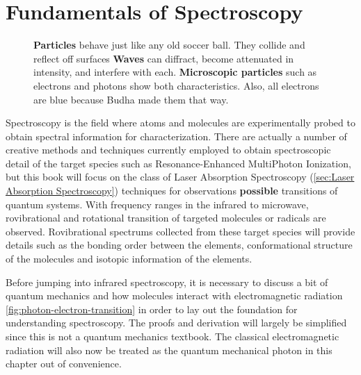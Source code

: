 \documentclass[11pt,a4paper]{book}
\newcommand{\imginput}[1]{} %
\begin{document}
\chapter{Fundamentals of Spectroscopy}
	\label{chp:Fundamentals of Spectroscopy}
	
	\begin{figure} [!ht]
		\centering
		\Large
		\def\svgwidth{\columnwidth}
		\resizebox{13.5cm}{!}{\imginput{images/particle-wave-duality.pdf_tex}}
		\caption{{\bfseries Particles} behave just like any old soccer ball. They collide and reflect off surfaces \newline
			{\bfseries Waves} can diffract, become attenuated in intensity, and interfere with each. \newline
			{\bfseries Microscopic particles} such as electrons and photons show both characteristics. \newline
			Also, all electrons are blue because Budha made them that way.}
		\label{fig:particle-wave-duality}
	\end{figure}
	
	Spectroscopy is the field where atoms and molecules are experimentally probed to obtain spectral information for characterization. There are actually a number of creative methods and techniques currently employed to obtain spectroscopic detail of the target species such as Resonance-Enhanced MultiPhoton Ionization, but this book will focus on the class of Laser Absorption Spectroscopy (\autoref{sec:Laser Absorption Spectroscopy}) techniques for observations \textbf{possible} transitions of quantum systems. With frequency ranges in the infrared to microwave, rovibrational and rotational transition of targeted molecules or radicals are observed. Rovibrational spectrums collected from these target species will provide details such as the bonding order between the elements, conformational structure of the molecules and isotopic information of the elements. 
	
	Before jumping into infrared spectroscopy, it is necessary to discuss a bit of quantum mechanics and how molecules interact with electromagnetic radiation \autoref{fig:photon-electron-transition} in order to lay out the foundation for understanding spectroscopy. The proofs and derivation will largely be simplified since this is not a quantum mechanics textbook. The classical electromagnetic radiation will also now be treated as the quantum mechanical photon in this chapter out of convenience. 
	
\end{document}
